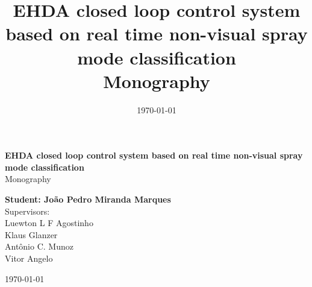 \begin{titlepage}
    \begin{center}
           
    \begin{figure}
            \centering
            \hspace{0.1\textwidth}
            \vspace{3cm} 
        \end{figure}

    

    {\bf\Large EHDA closed loop control system based on real time non-visual spray mode classification\\}
    \vspace{1cm} 
    {\Large Monography}
    \vspace{2cm}  
    
    {\bf\large Student: João Pedro Miranda Marques}\\
    \vspace{2cm}
    {\large Supervisors:\\ Luewton L F Agostinho\\
            Klaus Glanzer \\
            Antônio C. Munoz\\
            Vitor Angelo}
    \vspace{2cm}  

    \today
    \vspace{2cm}  
       

    \large \date{\today}
    \end{center}
    
    \end{titlepage}



\title{
    EHDA closed loop control system based on real time non-visual spray mode classification \\
    \large Monography}
